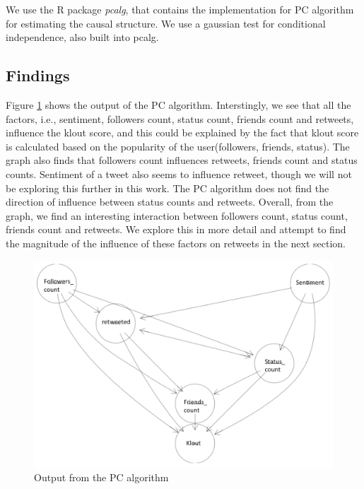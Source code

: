 We use the R package \textit{pcalg}, that contains the implementation for PC algorithm for estimating the causal structure. We use a gaussian test for conditional independence, also built into pcalg. 

\subsection{Findings}
Figure \ref{pcoutput} shows the output of the PC algorithm. Interstingly, we see that all the factors, i.e., sentiment, followers count, status count, friends count and retweets, influence the klout score, and this could be explained by the fact that klout score is calculated based on the popularity of the user(followers, friends, status). The graph also finds that followers count influences retweets, friends count and status counts. Sentiment of a tweet also seems to influence retweet, though we will not be exploring this further in this work. The PC algorithm does not find the direction of influence between status counts and retweets. Overall, from the graph, we find an interesting interaction between followers count, status count, friends count and retweets. We explore this in more detail and attempt to find the magnitude of the influence of these factors on retweets in the next section. 
\begin{center}
\begin{figure}
\includegraphics[scale=0.2]{pc}
\caption{Output from the PC algorithm}
\label{pcoutput}
\end{figure}
\end{center}

